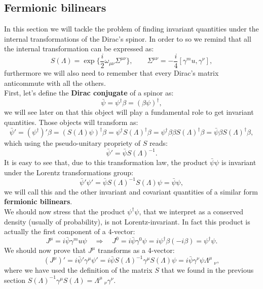 \subsection{Fermionic bilinears}
In this section we will tackle the problem of finding invariant quantities under the internal transformations of the Dirac's spinor. In order to so we remind that all the internal transformation can be expressed as:
\begin{equation*}
    S(\Lambda)=\exp\bigg\{\frac{i}{2}\omega_{\mu\nu}\Sigma^{\mu\nu}\bigg\},\qquad\Sigma^{\mu\nu}=-\frac{i}{4}[\gamma^mu,\gamma^\nu],
\end{equation*} 
furthermore we will also need to remember that every Dirac's matrix anticommute with all the others.\\

First, let's define the \textbf{Dirac conjugate} of a spinor as:
\begin{equation}
    \bar\psi=\psi^\dagger\beta=(\beta\psi)^\dagger,\label{DiracConjugate}
\end{equation}
we will see later on that this object will play a fundamental role to get invariant quantities. Those objects will transform as:
\begin{equation*}
    \bar{\psi}'=(\psi^{\dagger})' \beta=(S(\Lambda)\psi)^{\dagger} \beta=\psi^{\dagger} S(\Lambda)^{\dagger} \beta=\psi^{\dagger}\beta\beta S(\Lambda)^{\dagger} \beta=\bar{\psi}\beta S(\Lambda)^{\dagger} \beta,
\end{equation*}
which using the pseudo-unitary propriety of $S$ reads:
\begin{equation*}
    \bar{\psi}'=\bar{\psi} S(\Lambda)^{-1}.
\end{equation*}
It is easy to see that, due to this transformation law, the product $\bar{\psi}\psi$ is invariant under the Lorentz transformations group:
\begin{equation*}
    \bar{\psi}'\psi'=\bar{\psi}S(\Lambda)^{-1}S(\Lambda)\psi=\bar{\psi}\psi,
\end{equation*}
we will call this and the other invariant and covariant quantities of a similar form \textbf{fermionic bilinears}.\\
We should now stress that the product $\psi^\dagger\psi$, that we interpret as a conserved density (usually of probability), is not Lorentz-invariant. In fact this product is actually the first component of a 4-vector:
\begin{equation*}
    J^\mu=i\bar{\psi}\gamma^mu\psi\quad\Rightarrow\quad J^0=i\bar{\psi}\gamma^0\psi=i\psi^\dagger\beta(-i\beta)=\psi^\dagger\psi.
\end{equation*}
We should now prove that $J^\mu$ transforms as a 4-vector:
\begin{equation*}
    (J^\mu)'=i\bar{\psi}' \gamma^\mu\psi' =i\bar{\psi}S(\Lambda)^{-1}\gamma^\mu S(\Lambda)\psi=i\bar{\psi}\gamma^\nu\psi\Lambda^\mu\ _\nu,
\end{equation*}
where we have used the definition of the matrix $S$ that we found in the previous section $S(\Lambda)^{-1}\gamma^\mu S(\Lambda)=\Lambda^\mu\ _\nu\gamma^\nu$.\\

